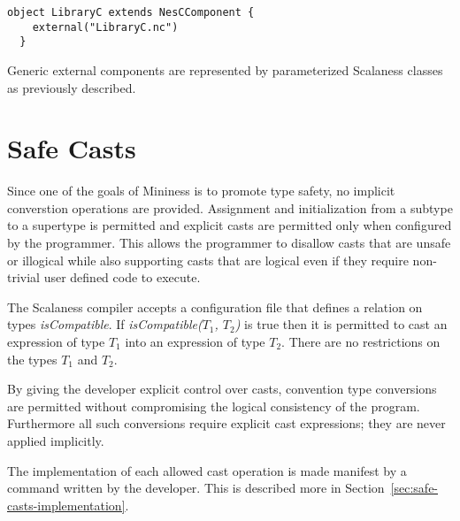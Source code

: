 \singlespace
\vspace{1.0ex}
\begin{Verbatim}[fontsize=\small]
  object LibraryC extends NesCComponent {
    external("LibraryC.nc")
  }
\end{Verbatim}
\vspace{1.0ex}
\primaryspacing

Generic external components are represented by parameterized Scalaness classes as previously
described.

\section{Safe Casts}
\label{sec:safe-casts-design}

Since one of the goals of Mininess is to promote type safety, no implicit converstion operations
are provided. Assignment and initialization from a subtype to a supertype is permitted and
explicit casts are permitted only when configured by the programmer. This allows the programmer
to disallow casts that are unsafe or illogical while also supporting casts that are logical even
if they require non-trivial user defined code to execute.

The Scalaness compiler accepts a configuration file that defines a relation on types
\textit{isCompatible}. If \textit{isCompatible($T_1$, $T_2$)} is true then it is permitted to
cast an expression of type $T_1$ into an expression of type $T_2$. There are no restrictions on
the types $T_1$ and $T_2$.

By giving the developer explicit control over casts, convention type conversions are permitted
without compromising the logical consistency of the program. Furthermore all such conversions
require explicit cast expressions; they are never applied implicitly.

The implementation of each allowed cast operation is made manifest by a command written by the
developer. This is described more in Section~\ref{sec:safe-casts-implementation}.



